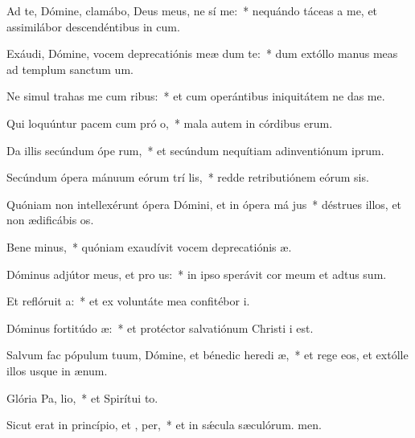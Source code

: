 \item Ad te, Dómine, clamábo, Deus meus, ne sí  me:~* nequándo táceas a me, et assimilábor descendéntibus in cum.
\item Exáudi, Dómine, vocem deprecatiónis meæ dum   te:~* dum extóllo manus meas ad templum sanctum um.
\item Ne simul trahas me cum ribus:~* et cum operántibus iniquitátem ne das me.
\item Qui loquúntur pacem cum pró o,~* mala autem in córdibus erum.
\item Da illis secúndum ópe rum,~* et secúndum nequítiam adinventiónum iprum.
\item Secúndum ópera mánuum eórum trí lis,~* redde retributiónem eórum sis.
\item Quóniam non intellexérunt ópera Dómini, et in ópera má jus~* déstrues illos, et non ædificábis os.
\item Bene minus,~* quóniam exaudívit vocem deprecatiónis æ.
\item Dóminus adjútor meus, et pro us:~* in ipso sperávit cor meum et adtus sum.
\item Et reflóruit  a:~* et ex voluntáte mea confitébor i.
\item Dóminus fortitúdo  æ:~* et protéctor salvatiónum Christi i est.
\item Salvum fac pópulum tuum, Dómine, et bénedic heredi æ,~* et rege eos, et extólle illos usque in ænum.
\item Glória Pa,  lio,~* et Spirítui to.
\item Sicut erat in princípio, et ,  per,~* et in sǽcula sæculórum. men.
